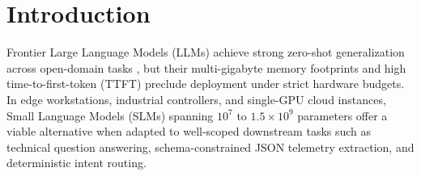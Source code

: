 \documentclass[10pt,a4paper,twocolumn]{article}
\begin{document}
\section{Introduction}

Frontier Large Language Models (LLMs) achieve strong zero-shot generalization across open-domain tasks \citep{brown2020language,achiam2023gpt4}, but their multi-gigabyte memory footprints and high time-to-first-token (TTFT) preclude deployment under strict hardware budgets. In edge workstations, industrial controllers, and single-GPU cloud instances, Small Language Models (SLMs) spanning $10^7$ to $1.5 \times 10^9$ parameters \citep{yang2024qwen25,gong2025minimind} offer a viable alternative when adapted to well-scoped downstream tasks such as technical question answering, schema-constrained JSON telemetry extraction, and deterministic intent routing.
\end{document}
